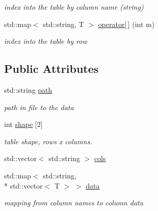 \begin{DoxyCompactItemize}
\begin{DoxyCompactList}\small\item\em index into the table by column name (string) \end{DoxyCompactList}\item 
\hypertarget{classh5wrap_1_1_homogenous_type_table_a777f6bdc03111b5a7d8fde59e184e26c}{std\+::map$<$ std\+::string, T $>$ \hyperlink{classh5wrap_1_1_homogenous_type_table_a777f6bdc03111b5a7d8fde59e184e26c}{operator\mbox{[}$\,$\mbox{]}} (int m)}\label{classh5wrap_1_1_homogenous_type_table_a777f6bdc03111b5a7d8fde59e184e26c}

\begin{DoxyCompactList}\small\item\em index into the table by row \end{DoxyCompactList}\end{DoxyCompactItemize}
\subsection*{Public Attributes}
\begin{DoxyCompactItemize}
\item 
\hypertarget{classh5wrap_1_1_homogenous_type_table_a6da460e4b94719f9ff5fe0d17e8859d7}{std\+::string \hyperlink{classh5wrap_1_1_homogenous_type_table_a6da460e4b94719f9ff5fe0d17e8859d7}{path}}\label{classh5wrap_1_1_homogenous_type_table_a6da460e4b94719f9ff5fe0d17e8859d7}

\begin{DoxyCompactList}\small\item\em path in file to the data \end{DoxyCompactList}\item 
\hypertarget{classh5wrap_1_1_homogenous_type_table_ab0e03ddbee134e775ea6fa389897fc8b}{int \hyperlink{classh5wrap_1_1_homogenous_type_table_ab0e03ddbee134e775ea6fa389897fc8b}{shape} \mbox{[}2\mbox{]}}\label{classh5wrap_1_1_homogenous_type_table_ab0e03ddbee134e775ea6fa389897fc8b}

\begin{DoxyCompactList}\small\item\em table shape, rows x columns. \end{DoxyCompactList}\item 
std\+::vector$<$ std\+::string $>$ \hyperlink{classh5wrap_1_1_homogenous_type_table_a8b60fa54475f44bea26caab0137d8507}{cols}
\item 
\hypertarget{classh5wrap_1_1_homogenous_type_table_a06c1889b5469abf303923b17b78a381b}{std\+::map$<$ std\+::string, \\*
std\+::vector$<$ T $>$ $>$ \hyperlink{classh5wrap_1_1_homogenous_type_table_a06c1889b5469abf303923b17b78a381b}{data}}\label{classh5wrap_1_1_homogenous_type_table_a06c1889b5469abf303923b17b78a381b}

\begin{DoxyCompactList}\small\item\em mapping from column names to column data \end{DoxyCompactList}\end{DoxyCompactItemize}


